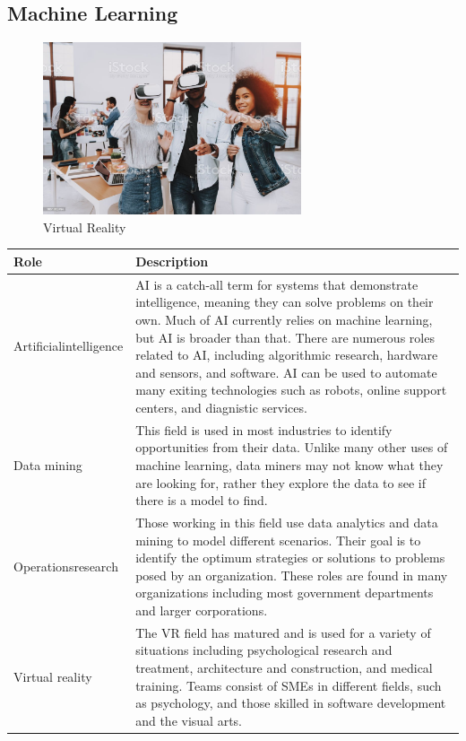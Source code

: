\subsection{Machine Learning}

\begin{figure}[H]
	\begin{center}
		\caption{Virtual Reality}
		\vskip 4pt
		\includegraphics[height=2in]{images/careers/istockphoto-1051052494-1024x1024.jpg}
	\end{center}
\end{figure}

\begin{table}[H]
	\begin{center}
		\begin{tabular}{p{1in}|p{3.4in}} 
			\textbf{Role} & \textbf{Description}\\
			\hline
			Artificial\linebreak intelligence & AI is a catch-all term for systems that demonstrate intelligence, meaning they can solve problems on their own. Much of AI currently relies on machine learning, but AI is broader than that. There are numerous roles related to AI, including algorithmic research, hardware and sensors, and software. AI can be used to automate many exiting technologies such as robots, online support centers, and diagnistic services.\\
			\hline
			Data mining & This field is used in most industries to identify opportunities from their data. Unlike many other uses of machine learning, data miners may not know what they are looking for, rather they explore the data to see if there is a model to find.\\
			\hline
			Operations\linebreak research & Those working in this field use data analytics and data mining to model different scenarios. Their goal is to identify the optimum strategies or solutions to problems posed by an organization. These roles are found in many organizations including most government departments and larger corporations.\\
			\hline
			Virtual reality & The VR field has matured and is used for a variety of situations including psychological research and treatment, architecture and construction, and medical training. Teams consist of SMEs in different fields, such as psychology, and those skilled in software development and the visual arts.\\
			\hline
		\end{tabular}
	\end{center}
\end{table}

